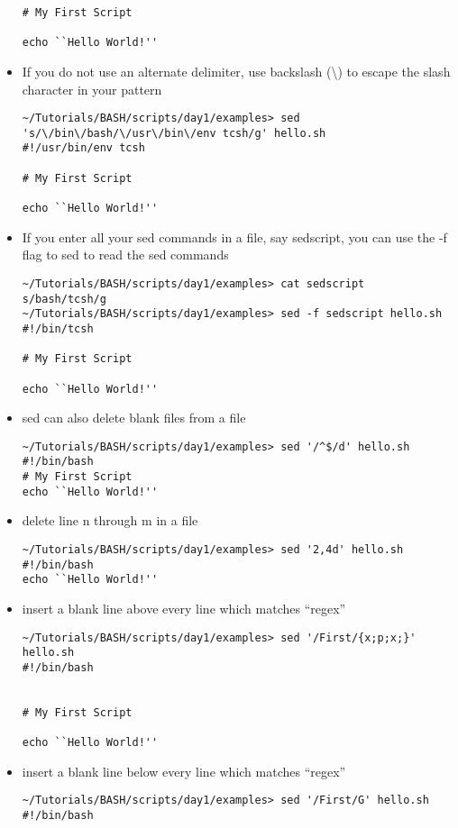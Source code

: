 \documentclass[10pt,t]{beamer}
\begin{document}
\begin{frame}
\begin{itemize}
\begin{lstlisting}[style=LINUX]
# My First Script

echo ``Hello World!''
      \end{lstlisting}
      \framebreak
    \item If you do not use an alternate delimiter, use backslash (\textbackslash) to escape the slash character in your pattern
      \begin{lstlisting}[style=LINUX]
~/Tutorials/BASH/scripts/day1/examples> sed 's/\/bin\/bash/\/usr\/bin\/env tcsh/g' hello.sh 
#!/usr/bin/env tcsh

# My First Script

echo ``Hello World!''
      \end{lstlisting}
    \item If you enter all your sed commands in a file, say sedscript, you can use the -f flag to sed to read the sed commands
      \begin{lstlisting}[style=LINUX]
~/Tutorials/BASH/scripts/day1/examples> cat sedscript
s/bash/tcsh/g
~/Tutorials/BASH/scripts/day1/examples> sed -f sedscript hello.sh 
#!/bin/tcsh

# My First Script

echo ``Hello World!''
      \end{lstlisting}
    \item sed can also delete blank files from a file
      \begin{lstlisting}[style=LINUX]
~/Tutorials/BASH/scripts/day1/examples> sed '/^$/d' hello.sh 
#!/bin/bash
# My First Script
echo ``Hello World!''
      \end{lstlisting}
    \item delete line n through m in a file
      \begin{lstlisting}[style=LINUX]
~/Tutorials/BASH/scripts/day1/examples> sed '2,4d' hello.sh 
#!/bin/bash
echo ``Hello World!''
      \end{lstlisting}
      \framebreak
      \item insert a blank line above every line which matches ``regex''
        \begin{lstlisting}[style=LINUX]
~/Tutorials/BASH/scripts/day1/examples> sed '/First/{x;p;x;}' hello.sh 
#!/bin/bash


# My First Script

echo ``Hello World!''
        \end{lstlisting}
      \item insert a blank line below every line which matches ``regex''
        \begin{lstlisting}[style=LINUX]
~/Tutorials/BASH/scripts/day1/examples> sed '/First/G' hello.sh 
#!/bin/bash


\end{lstlisting}
\end{itemize}
\end{frame}
\end{document}
